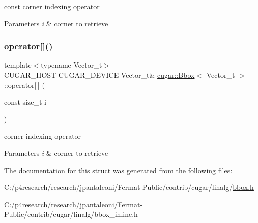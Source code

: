 const corner indexing operator


\begin{DoxyParams}{Parameters}
{\em i} & corner to retrieve \\
\hline
\end{DoxyParams}
\mbox{\label{structcugar_1_1_bbox_ae2c89d95f41ecc119b31e42defdccea4}} 
\subsubsection{\texorpdfstring{operator[]()}{operator[]()}\hspace{0.1cm}{\footnotesize\ttfamily [2/2]}}
{\footnotesize\ttfamily template$<$typename Vector\+\_\+t$>$ \\
C\+U\+G\+A\+R\+\_\+\+H\+O\+ST C\+U\+G\+A\+R\+\_\+\+D\+E\+V\+I\+CE Vector\+\_\+t\& \hyperlink{structcugar_1_1_bbox}{cugar\+::\+Bbox}$<$ Vector\+\_\+t $>$\+::operator\mbox{[}$\,$\mbox{]} (\begin{DoxyParamCaption}\item[{const size\+\_\+t}]{i }\end{DoxyParamCaption})\hspace{0.3cm}{\ttfamily [inline]}}

corner indexing operator


\begin{DoxyParams}{Parameters}
{\em i} & corner to retrieve \\
\hline
\end{DoxyParams}


The documentation for this struct was generated from the following files\+:\begin{DoxyCompactItemize}
\item 
C\+:/p4research/research/jpantaleoni/\+Fermat-\/\+Public/contrib/cugar/linalg/\hyperlink{bbox_8h}{bbox.\+h}\item 
C\+:/p4research/research/jpantaleoni/\+Fermat-\/\+Public/contrib/cugar/linalg/bbox\+\_\+inline.\+h\end{DoxyCompactItemize}
